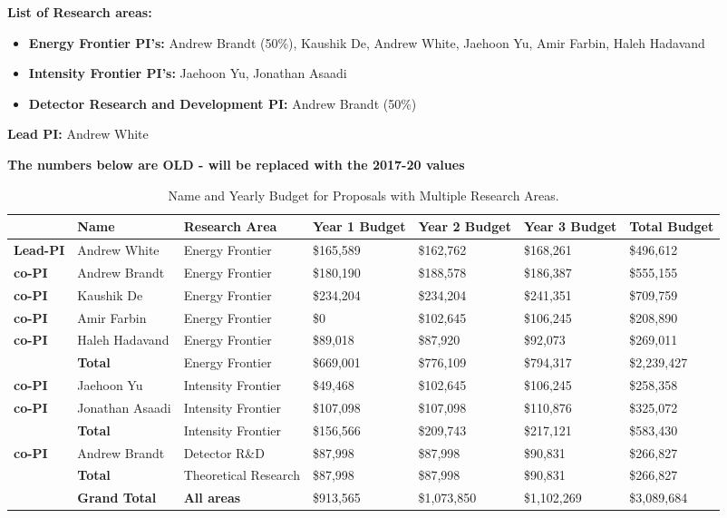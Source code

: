 
\noindent\textbf{List of Research areas:}
\begin{itemize}[noitemsep,nolistsep]
   \item \textbf{Energy Frontier PI's:} Andrew Brandt (50\%), Kaushik De, Andrew White, Jaehoon Yu, Amir Farbin, Haleh Hadavand
	\item \textbf{Intensity Frontier PI's:} Jaehoon Yu, Jonathan Asaadi
	\item \textbf{Detector Research and Development PI:} Andrew Brandt (50\%)
\end{itemize}

\noindent\textbf{Lead PI:} Andrew White
\vspace*{0.15in}

\textbf{\LARGE The numbers below are OLD - will be replaced with the 2017-20 values}
\vspace*{0.15in}

\begin{table}[htb]
\centering
\begin{tabular}{ || l || l |  p{1.7cm} | p{1.7cm} | p{1.7cm} || p{1.7cm} | p{1.8cm} || }
\hline\hline\hline
 & \textbf{Name} & \textbf{Research Area} & \textbf{Year 1 Budget} & \textbf{Year 2 Budget} & \textbf{Year 3 Budget} & \textbf{Total Budget} \\ \hline\hline
\textbf{Lead-PI} & Andrew White & Energy Frontier & \$165,589 & \$162,762 & \$168,261 & \$496,612 \\ \hline
\textbf{co-PI} & Andrew Brandt & Energy Frontier & \$180,190 & \$188,578 & \$186,387 & \$555,155 \\ \hline
\textbf{co-PI} & Kaushik De & Energy Frontier & \$234,204 & \$234,204 & \$241,351 & \$709,759  \\ \hline
\textbf{co-PI} & Amir Farbin & Energy Frontier & \$0 & \$102,645 & \$106,245 & \$208,890 \\ \hline
\textbf{co-PI} & Haleh Hadavand & Energy Frontier & \$89,018 & \$87,920 & \$92,073 & \$269,011 \\ \hline\hline
 & \textbf{Total} & Energy Frontier & \$669,001 & \$776,109 & \$794,317 & \$2,239,427 \\ \hline\hline
\textbf{co-PI} & Jaehoon Yu & Intensity Frontier & \$49,468 & \$102,645 & \$106,245 & \$258,358 \\ \hline
\textbf{co-PI} & Jonathan Asaadi & Intensity Frontier & \$107,098 & \$107,098 & \$110,876 & \$325,072 \\ \hline\hline
 & \textbf{Total} & Intensity Frontier & \$156,566 & \$209,743 & \$217,121 & \$583,430 \\ \hline\hline
\textbf{co-PI} & Andrew Brandt & Detector R\&D & \$87,998 & \$87,998 & \$90,831 & \$266,827 \\ \hline\hline
 & \textbf{Total} & Theoretical Research & \$87,998 & \$87,998 & \$90,831 & \$266,827 \\ \hline\hline\hline
 & \textbf{Grand Total} & \textbf{All areas} & \$913,565 & \$1,073,850 & \$1,102,269 & \$3,089,684 \\ \hline\hline\hline
\end{tabular}
\caption{Name and Yearly Budget for Proposals with Multiple Research Areas.}
\end{table}
